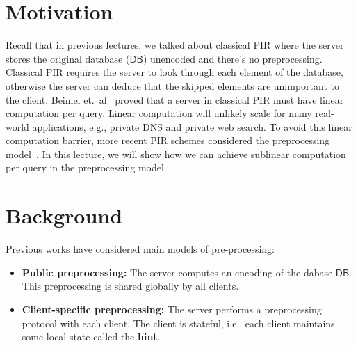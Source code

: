 \newcommand{\PRF}{\ensuremath{{\sf PRF}}}




\section{Motivation}
Recall that in previous lectures, we talked about classical PIR where the server stores the original database ($\mathsf{DB}$) unencoded and there's no preprocessing. Classical PIR requires the server to look through each element of the database, otherwise the server can deduce that the skipped elements are unimportant to the client. Beimel et.~al~\cite{beimel2000reducing} proved that a server in classical PIR must have linear computation per query.
Linear computation will unlikely 
scale for many real-world applications, e.g., private DNS and private 
web search. 
To avoid this linear computation barrier,  
more recent PIR schemes 
considered 
the preprocessing model~\cite{beimel2000reducing,sublinearpir}. 
In this lecture, we will show how we can achieve sublinear computation
per query in the preprocessing model. 

\section{Background}
Previous works have considered 
main models of pre-processing: 

    \begin{itemize}
        \item \textbf{Public preprocessing:} The server computes an encoding of the dabase 
$\mathsf{DB}$. This preprocessing is shared
globally by all clients. %
        \item \textbf{Client-specific preprocessing:} 
The server performs a preprocessing protocol with each client. The client is stateful, i.e., each client maintains some local state called the \textbf{hint}.
    \end{itemize}

